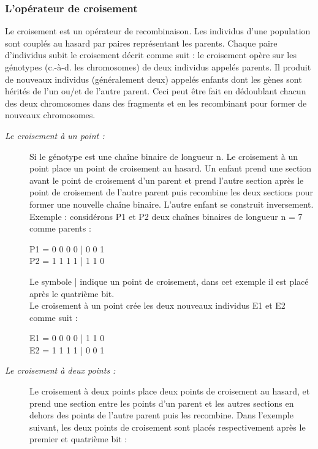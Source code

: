 \documentclass[12pt,a4paper]{article}
\begin{document}
	\subsubsection{L’opérateur de croisement}
	Le croisement est un opérateur de recombinaison. Les individus d’une population sont couplés au hasard par paires représentant les parents. Chaque paire d’individus
subit le croisement décrit comme suit : le croisement opère sur les génotypes (c.-à-d. les chromosomes) de deux individus appelés parents. Il produit de nouveaux individus (généralement deux) appelés enfants dont les gènes sont hérités de l’un ou/et de l’autre parent. Ceci peut être fait en dédoublant chacun des deux chromosomes dans des fragments et en les recombinant pour former de nouveaux chromosomes.
	\begin{description}
		\item[\textsl{Le croisement à un point :}] Si le génotype est une chaîne binaire de longueur n. Le croisement à un point place un point de croisement au
hasard. Un enfant prend une section avant le point de croisement d’un parent et prend l’autre section après le point de croisement de l’autre parent puis recombine les deux sections pour former une nouvelle chaîne binaire. L’autre enfant se construit inversement. Exemple : considérons P1 et P2 deux chaînes binaires de
longueur n = 7 comme parents :
	\begin{center}
		P1 = 0 0 0 0 | 0 0 1 \\
		P2 = 1 1 1 1 | 1 1 0
	\end{center}
	\hspace*{.5cm} Le symbole | indique un point de croisement, dans cet exemple il est placé après le quatrième bit. \\
	\hspace*{.5cm} Le croisement à un point crée les deux nouveaux individus E1 et E2 comme suit :
	\begin{center}
		E1 = 0 0 0 0 | 1 1 0 \\
		E2 = 1 1 1 1 | 0 0 1
	\end{center}
		
		\item[\textsl{Le croisement à deux points :}]Le croisement à deux points place deux points de croisement au hasard, et prend une section entre les points d’un parent et les autres sections en dehors des points de l’autre parent puis les recombine. Dans l’exemple suivant, les deux points de croisement sont placés respectivement après le premier et quatrième bit :
	

\end{description}
\end{document}

